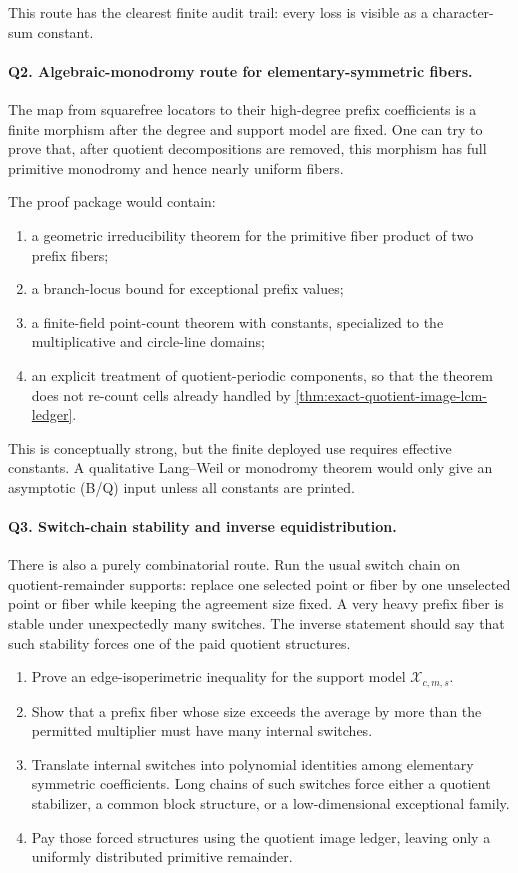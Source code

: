 \documentclass[11pt]{article}
\theoremstyle{definition}
\theoremstyle{remark}
\begin{document}
This route has the clearest finite audit trail: every loss is visible as a character-sum constant.

\paragraph{Q2. Algebraic-monodromy route for elementary-symmetric fibers.}
The map from squarefree locators to their high-degree prefix coefficients is a finite morphism after the degree and support model are fixed.  One can try to prove that, after quotient decompositions are removed, this morphism has full primitive monodromy and hence nearly uniform fibers.

The proof package would contain:
\begin{enumerate}[label=\textup{Q2.\arabic*},leftmargin=3.0em]
\item a geometric irreducibility theorem for the primitive fiber product of two prefix fibers;
\item a branch-locus bound for exceptional prefix values;
\item a finite-field point-count theorem with constants, specialized to the multiplicative and circle-line domains;
\item an explicit treatment of quotient-periodic components, so that the theorem does not re-count cells already handled by \cref{thm:exact-quotient-image-lcm-ledger}.
\end{enumerate}

This is conceptually strong, but the finite deployed use requires effective constants.  A qualitative Lang--Weil or monodromy theorem would only give an asymptotic \textup{(B/Q)} input unless all constants are printed.

\paragraph{Q3. Switch-chain stability and inverse equidistribution.}
There is also a purely combinatorial route.  Run the usual switch chain on quotient-remainder supports: replace one selected point or fiber by one unselected point or fiber while keeping the agreement size fixed.  A very heavy prefix fiber is stable under unexpectedly many switches.  The inverse statement should say that such stability forces one of the paid quotient structures.

\begin{enumerate}[label=\textup{Q3.\arabic*},leftmargin=3.0em]
\item Prove an edge-isoperimetric inequality for the support model $\mathcal X_{c,m,s}$.
\item Show that a prefix fiber whose size exceeds the average by more than the permitted multiplier must have many internal switches.
\item Translate internal switches into polynomial identities among elementary symmetric coefficients.  Long chains of such switches force either a quotient stabilizer, a common block structure, or a low-dimensional exceptional family.
\item Pay those forced structures using the quotient image ledger, leaving only a uniformly distributed primitive remainder.
\end{enumerate}
\end{document}
